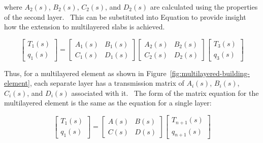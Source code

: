 where \(A_2(s)\), \(B_2(s)\), \(C_2(s)\), and \(D_2(s)\) are calculated using the properties of the second layer.~ This can be substituted into Equation to provide insight how the extension to multilayered slabs is achieved.

\begin{equation}
\left[ {\begin{array}{*{20}{c}}{{T_1}\left( s \right)}\\ {{q_1}\left( s \right)}\end{array}} \right] = \left[ {\begin{array}{*{20}{c}}{{A_1}\left( s \right)}&{{B_1}\left( s \right)}\\ {{C_1}\left( s \right)}&{{D_1}\left( s \right)}\end{array}} \right]\left[ {\begin{array}{*{20}{c}}{{A_2}\left( s \right)}&{{B_2}\left( s \right)}\\ {{C_2}\left( s \right)}&{{D_2}\left( s \right)}\end{array}} \right]\left[ {\begin{array}{*{20}{c}}{{T_3}\left( s \right)}\\ {{q_3}\left( s \right)}\end{array}} \right]
\end{equation}

Thus, for a multilayered element as shown in Figure~\ref{fig:multilayered-building-element}, each separate layer has a transmission matrix of \(A_i(s)\), \(B_i(s)\), \(C_i(s)\), and \(D_i(s)\) associated with it.~ The form of the matrix equation for the multilayered element is the same as the equation for a single layer:

\begin{equation}
\left[ {\begin{array}{*{20}{c}}{{T_1}\left( s \right)}\\ {{q_1}\left( s \right)}\end{array}} \right] = \left[ {\begin{array}{*{20}{c}}{A\left( s \right)}&{B\left( s \right)}\\ {C\left( s \right)}&{D\left( s \right)}\end{array}} \right]\left[ {\begin{array}{*{20}{c}}{{T_{n + 1}}\left( s \right)}\\ {{q_{n + 1}}\left( s \right)}\end{array}} \right]
\label{eq:LaplaceMultiLayerMatrix}
\end{equation}

